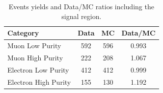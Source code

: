 \begin{table}[h!]
\begin{center}
\caption[Data/MC ratios after unblind]{Events yields and Data/MC ratios including the signal region.}
\label{dataMCunblind}
\begin{tabular}{lccc}
\hline
\textbf{Category}    & \textbf{Data} & \textbf{MC}   &\textbf{Data/MC} \\ \hline
Muon Low Purity      & 592           & 596           & 0.993 \\
Muon High Purity     & 222           & 208           & 1.067 \\
Electron Low Purity  & 412           & 412           & 0.999 \\
Electron High Purity & 155           & 130           & 1.192 \\
\hline
\end{tabular}
\end{center}
\end{table}

